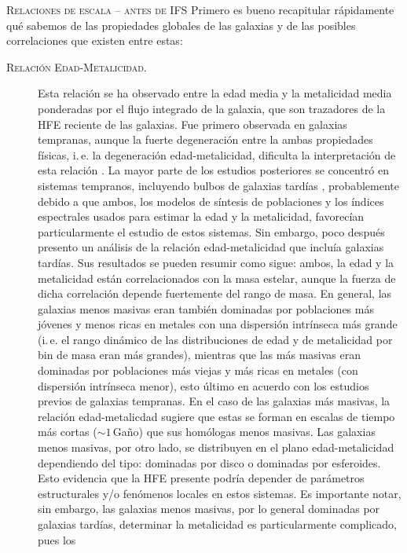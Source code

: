\documentclass[xcolor=dvipsnames,4pt,hyperref={colorlinks,citecolor=black,linkcolor=black,urlcolor=black}]{beamer}
\begin{document}
\begin{frame}[allowframebreaks]{\textsc{Relaciones de escala -- antes de IFS}}
%
Primero es bueno recapitular rápidamente qué sabemos de las propiedades globales de las galaxias y
de las posibles correlaciones que existen entre estas:
%
\begin{description}
%
\item[\textsc{Relación Edad-Metalicidad.}] Esta relación se ha observado entre la edad media y la
metalicidad media ponderadas por el flujo integrado de la galaxia, que son trazadores de la HFE
reciente de las galaxias. Fue primero observada en galaxias tempranas, aunque la fuerte degeneración
entre la ambas propiedades físicas, i.\,e. la degeneración edad-metalicidad, dificulta la
interpretación de esta relación \citep{Worthey1994}. La mayor parte de los estudios
posteriores se concentró en sistemas tempranos, incluyendo bulbos de galaxias tardías
\citep{Proctor2002, Terlevich2002}, probablemente debido a que ambos, los modelos de síntesis de
poblaciones y los índices espectrales usados para estimar la edad y la metalicidad, favorecían
particularmente el estudio de estos sistemas. Sin embargo, poco después \citet{Gallazzi2005}
presento un análisis de la relación edad-metalicidad que incluía galaxias tardías. Sus resultados se
pueden resumir como sigue: ambos, la edad y la metalicidad están correlacionados con la masa
estelar, aunque la fuerza de dicha correlación depende fuertemente del rango de masa. En general,
las galaxias menos masivas eran también dominadas por poblaciones más jóvenes y menos ricas en
metales con una dispersión intrínseca más grande (i.\,e. el rango dinámico de las distribuciones de
edad y de metalicidad por bin de masa eran más grandes), mientras que las más masivas eran dominadas
por poblaciones más viejas y más ricas en metales (con dispersión intrínseca menor), esto último en
acuerdo con los estudios previos de galaxias tempranas. En el caso de las galaxias más masivas, la
relación edad-metalicdad sugiere que estas se forman en escalas de tiempo más cortas ($\sim1\,$Gaño)
que sus homólogas menos masivas. Las galaxias menos masivas, por otro lado, se distribuyen en el
plano edad-metalicidad dependiendo del tipo: dominadas por disco o dominadas por esferoides. Esto
evidencia que la HFE presente podría depender de parámetros estructurales y/o fenómenos locales en
estos sistemas. Es importante notar, sin embargo, las galaxias menos masivas, por lo general
dominadas por galaxias tardías, determinar la metalicidad es particularmente complicado, pues los

\end{description}
\end{frame}
\end{document}
